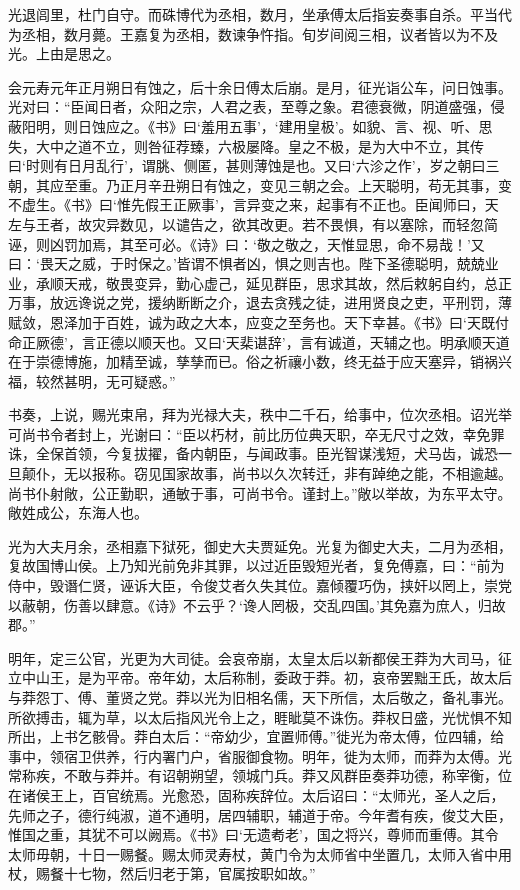\documentclass[12pt,UTF8]{ctexbook}
\begin{document}
光退闾里，杜门自守。而硃博代为丞相，数月，坐承傅太后指妄奏事自杀。平当代为丞相，数月薨。王嘉复为丞相，数谏争忤指。旬岁间阅三相，议者皆以为不及光。上由是思之。



会元寿元年正月朔日有蚀之，后十余日傅太后崩。是月，征光诣公车，问日蚀事。光对曰：“臣闻日者，众阳之宗，人君之表，至尊之象。君德衰微，阴道盛强，侵蔽阳明，则日蚀应之。《书》曰‘羞用五事’，‘建用皇极’。如貌、言、视、听、思失，大中之道不立，则咎征荐臻，六极屡降。皇之不极，是为大中不立，其传曰‘时则有日月乱行’，谓朓、侧匿，甚则薄蚀是也。又曰‘六沴之作’，岁之朝曰三朝，其应至重。乃正月辛丑朔日有蚀之，变见三朝之会。上天聪明，苟无其事，变不虚生。《书》曰‘惟先假王正厥事’，言异变之来，起事有不正也。臣闻师曰，天左与王者，故灾异数见，以谴告之，欲其改更。若不畏惧，有以塞除，而轻忽简诬，则凶罚加焉，其至可必。《诗》曰：‘敬之敬之，天惟显思，命不易哉！’又曰：‘畏天之威，于时保之。’皆谓不惧者凶，惧之则吉也。陛下圣德聪明，兢兢业业，承顺天戒，敬畏变异，勤心虚己，延见群臣，思求其故，然后敕躬自约，总正万事，放远谗说之党，援纳断断之介，退去贪残之徒，进用贤良之吏，平刑罚，薄赋敛，恩泽加于百姓，诚为政之大本，应变之至务也。天下幸甚。《书》曰‘天既付命正厥德’，言正德以顺天也。又曰‘天棐谌辞’，言有诚道，天辅之也。明承顺天道在于崇德博施，加精至诚，孳孳而已。俗之祈禳小数，终无益于应天塞异，销祸兴福，较然甚明，无可疑惑。”



书奏，上说，赐光束帛，拜为光禄大夫，秩中二千石，给事中，位次丞相。诏光举可尚书令者封上，光谢曰：“臣以朽材，前比历位典天职，卒无尺寸之效，幸免罪诛，全保首领，今复拔擢，备内朝臣，与闻政事。臣光智谋浅短，犬马齿，诚恐一旦颠仆，无以报称。窃见国家故事，尚书以久次转迁，非有踔绝之能，不相逾越。尚书仆射敞，公正勤职，通敏于事，可尚书令。谨封上。”敞以举故，为东平太守。敞姓成公，东海人也。



光为大夫月余，丞相嘉下狱死，御史大夫贾延免。光复为御史大夫，二月为丞相，复故国博山侯。上乃知光前免非其罪，以过近臣毁短光者，复免傅嘉，曰：“前为侍中，毁谮仁贤，诬诉大臣，令俊艾者久失其位。嘉倾覆巧伪，挟奸以罔上，崇党以蔽朝，伤善以肆意。《诗》不云乎？‘谗人罔极，交乱四国。’其免嘉为庶人，归故郡。”



明年，定三公官，光更为大司徒。会哀帝崩，太皇太后以新都侯王莽为大司马，征立中山王，是为平帝。帝年幼，太后称制，委政于莽。初，哀帝罢黜王氏，故太后与莽怨丁、傅、董贤之党。莽以光为旧相名儒，天下所信，太后敬之，备礼事光。所欲搏击，辄为草，以太后指风光令上之，睚眦莫不诛伤。莽权日盛，光忧惧不知所出，上书乞骸骨。莽白太后：“帝幼少，宜置师傅。”徙光为帝太傅，位四辅，给事中，领宿卫供养，行内署门户，省服御食物。明年，徙为太师，而莽为太傅。光常称疾，不敢与莽并。有诏朝朔望，领城门兵。莽又风群臣奏莽功德，称宰衡，位在诸侯王上，百官统焉。光愈恐，固称疾辞位。太后诏曰：“太师光，圣人之后，先师之子，德行纯淑，道不通明，居四辅职，辅道于帝。今年耆有疾，俊艾大臣，惟国之重，其犹不可以阙焉。《书》曰‘无遗耇老’，国之将兴，尊师而重傅。其令太师毋朝，十日一赐餐。赐太师灵寿杖，黄门令为太师省中坐置几，太师入省中用杖，赐餐十七物，然后归老于第，官属按职如故。”
\end{document}
